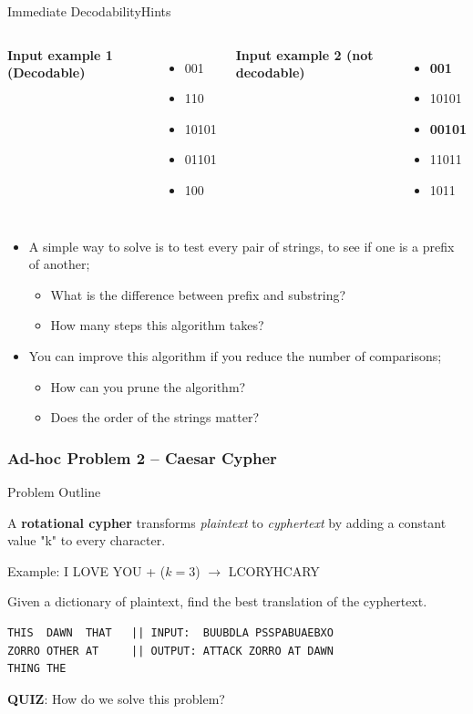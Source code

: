 \begin{frame}{Immediate Decodability}{Hints}
  \begin{columns}
    {\bf Input example 1 (Decodable)}
    \begin{itemize}
      \item 001
      \item 110
      \item 10101
      \item 01101
      \item 100
    \end{itemize}
    {\bf Input example 2 (not decodable)}
    \begin{itemize}
      \item {\bf 001}
      \item 10101
      \item {\bf 00101}
      \item 11011
      \item 1011
    \end{itemize}
  \end{columns}\bigskip

  \begin{itemize}
    \item A simple way to solve is to test every pair of strings, to see if one is a prefix of another;
    \begin{itemize}
      \item What is the difference between prefix and substring?
      \item How many steps this algorithm takes?
    \end{itemize}
    \item You can improve this algorithm if you reduce the number of comparisons;
    \begin{itemize}
      \item How can you prune the algorithm?
      \item Does the order of the strings matter?
    \end{itemize}
  \end{itemize}
\end{frame}


\begin{frame}[fragile]
  \frametitle{Ad-hoc Problem 2 -- Caesar Cypher}
    \begin{exampleblock}{Problem Outline}
      {\small A {\bf rotational cypher} transforms \emph{plaintext} to
      \emph{cyphertext} by adding a constant value "k" to every character.\medskip

      Example: I LOVE YOU + ($k = 3$) $\rightarrow$ LCORYHCARY\medskip

      Given a dictionary of plaintext, find the best translation of
      the cyphertext.}
    \end{exampleblock}

\begin{verbatim}
THIS  DAWN  THAT   || INPUT:  BUUBDLA PSSPABUAEBXO
ZORRO OTHER AT     || OUTPUT: ATTACK ZORRO AT DAWN
THING THE
\end{verbatim}
{\bf QUIZ}: How do we solve this problem?
\end{frame}

